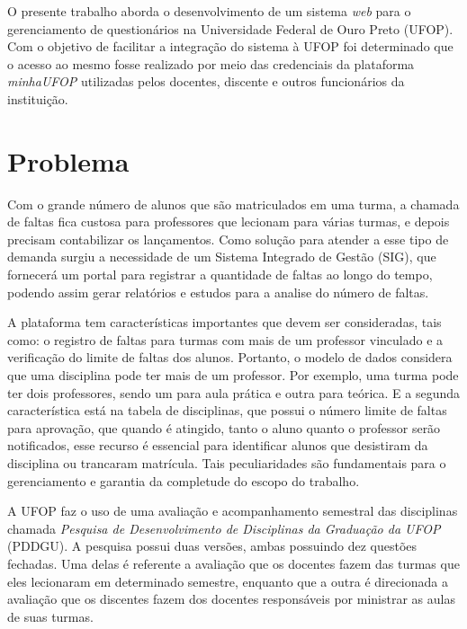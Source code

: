 \documentclass[
  12pt,       %
  openright,      %
  oneside,      %
  a4paper,      %
  english,      %
  french,        %
  spanish,     %
  brazil        %
  ]{abntex2-decsi}
\begin{document}
O presente trabalho aborda o desenvolvimento de um sistema \textit{web} para o gerenciamento de questionários na Universidade Federal de Ouro Preto (UFOP). Com o objetivo de facilitar a integração do sistema à UFOP foi determinado que o acesso ao mesmo fosse realizado por meio das credenciais da plataforma \textit{minhaUFOP} utilizadas pelos docentes, discente e outros funcionários da instituição. 

    \section{Problema}
    
Com o grande número de alunos que são matriculados em uma turma, a chamada de faltas fica custosa para professores que lecionam para várias turmas, e depois precisam contabilizar os lançamentos. Como solução para atender a esse tipo de demanda surgiu a necessidade de um Sistema Integrado de Gestão (SIG), que fornecerá um portal para registrar a quantidade de faltas ao longo do tempo, podendo assim gerar relatórios e estudos para a analise do número de faltas.

A plataforma tem características importantes que devem ser consideradas, tais como: o registro de faltas para turmas com mais de um professor vinculado e a verificação do limite de faltas dos alunos. Portanto, o modelo de dados considera que uma disciplina pode ter mais de um professor. Por exemplo, uma turma pode ter dois professores, sendo um para aula prática e outra para teórica. E a segunda característica está na tabela de disciplinas, que possui o número limite de faltas para aprovação, que quando é atingido, tanto o aluno quanto o professor serão notificados, esse recurso é essencial para identificar alunos que desistiram da disciplina ou trancaram matrícula. Tais peculiaridades são fundamentais para o gerenciamento e garantia da completude do escopo do trabalho. %

    

    A UFOP faz o uso de uma avaliação e acompanhamento semestral das disciplinas chamada \textit{Pesquisa de Desenvolvimento de Disciplinas da Graduação da UFOP} (PDDGU). A pesquisa possui duas versões, ambas possuindo dez questões fechadas. Uma delas é referente a avaliação que os docentes fazem das turmas que eles lecionaram em determinado semestre, enquanto que a outra é direcionada a avaliação que os discentes fazem dos docentes responsáveis por ministrar as aulas de suas turmas.
\end{document}
